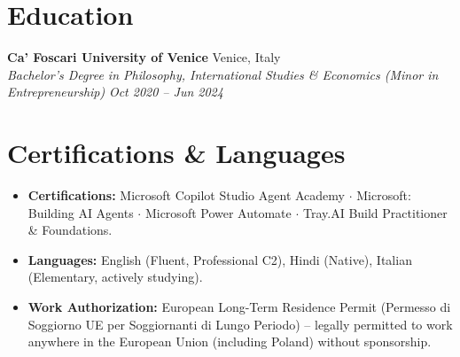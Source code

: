 \documentclass[10pt,a4paper]{article}
\begin{document}
\section{Education}
\textbf{Ca' Foscari University of Venice} \hfill Venice, Italy \\
\textit{Bachelor's Degree in Philosophy, International Studies \& Economics (Minor in Entrepreneurship)} \hfill \textit{Oct 2020 -- Jun 2024}

\section{Certifications \& Languages}
\begin{itemize}
    \item \textbf{Certifications:} Microsoft Copilot Studio Agent Academy $\cdot$ Microsoft: Building AI Agents $\cdot$ Microsoft Power Automate $\cdot$ Tray.AI Build Practitioner \& Foundations.
    \item \textbf{Languages:} English (Fluent, Professional C2), Hindi (Native), Italian (Elementary, actively studying).
    \item \textbf{Work Authorization:} European Long-Term Residence Permit (Permesso di Soggiorno UE per Soggiornanti di Lungo Periodo) -- legally permitted to work anywhere in the European Union (including Poland) without sponsorship.
\end{itemize}
\end{document}
